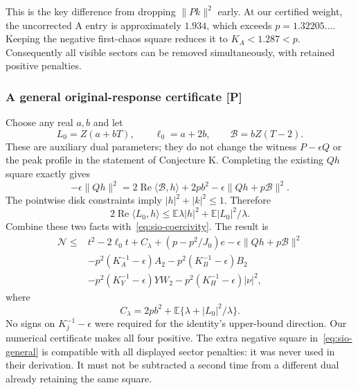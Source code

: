 This is the key difference from dropping $\|Pk\|^2$ early. At our
certified weight, the uncorrected A entry is approximately $1.934$,
which exceeds $p=1.32205\ldots$. Keeping the negative first-chaos square
reduces it to $K_A<1.287<p$. Consequently all visible sectors can be
removed simultaneously, with retained positive penalties.

\subsubsection{A general original-response certificate [P]}
Choose any real $a,b$ and let
\[
 L_0=Z(a+bT),\qquad \ell_0=a+2b,\qquad
 \mathcal B=bZ(T-2).
\]
These are auxiliary dual parameters; they do not change the witness
$P-\epsilon Q$ or the peak profile in the statement of Conjecture K.
Completing the existing $Qh$ square exactly gives
\[
 -\epsilon\|Qh\|^2
 =2\operatorname{Re}\langle\mathcal B,h\rangle+2pb^2
       -\epsilon\|Qh+p\mathcal B\|^2.
\]
The pointwise disk constraints imply $|h|^2+|k|^2\le1$. Therefore
\[
 2\operatorname{Re}\langle L_0,h\rangle
 \le\mathbb E\lambda|h|^2+\mathbb E|L_0|^2/\lambda.
\]
Combine these two facts with~\eqref{eq:sio-coercivity}. The result is
\begin{equation}\label{eq:sio-general}
\boxed{\begin{aligned}
 \mathcal N\le{}&t^2-2\ell_0t+C_\lambda+
               (p-p^2/J_0)e-\epsilon\|Qh+p\mathcal B\|^2\\
 &-p^2(K_A^{-1}-\epsilon)A_2-p^2(K_B^{-1}-\epsilon)B_2\\
 &-p^2(K_Y^{-1}-\epsilon)YW_2-p^2(K_H^{-1}-\epsilon)|\nu|^2,
\end{aligned}}
\end{equation}
where
\[
 C_\lambda=2pb^2+\mathbb E\{\lambda+|L_0|^2/\lambda\}.
\]
No signs on $K_j^{-1}-\epsilon$ were required for the identity's
upper-bound direction. Our numerical certificate makes all four positive.
The extra negative square in~\eqref{eq:sio-general} is compatible with
all displayed sector penalties: it was never used in their derivation.
It must not be subtracted a second time from a different dual already
retaining the same square.

